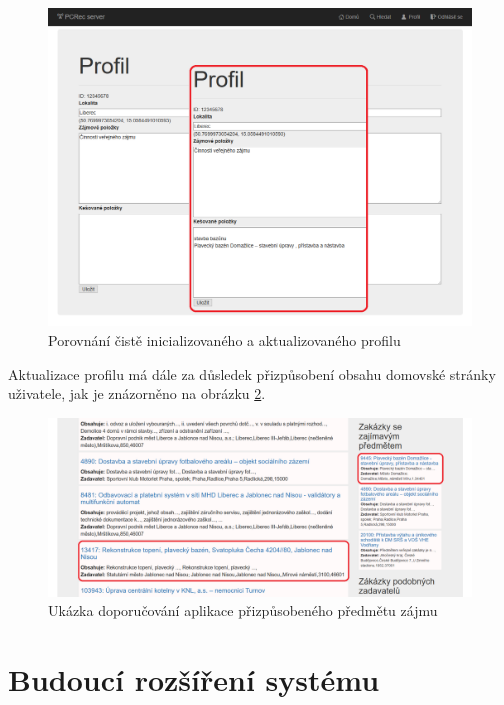 \documentclass[thesis=M,czech]{FITthesis}[2019/12/23]
\begin{document}
\begin{figure}\centering
	\includegraphics[width=\textwidth]{images/pcrec/pcrec_profile_edit.png}
	\caption{Porovnání čistě inicializovaného a aktualizovaného profilu}\label{fig:pcrec_profile1_edit}
\end{figure}

Aktualizace profilu má dále za důsledek přizpůsobení obsahu domovské stránky uživatele, jak je znázorněno na obrázku \ref{fig:pcrec_recommended}.
\begin{figure}\centering
	\includegraphics[width=\textwidth]{images/pcrec/pcrec_recommended_edit2.png}
	\caption{Ukázka doporučování aplikace přizpůsobeného předmětu zájmu }\label{fig:pcrec_recommended}
\end{figure}

\chapter{Budoucí rozšíření systému}
\end{document}

